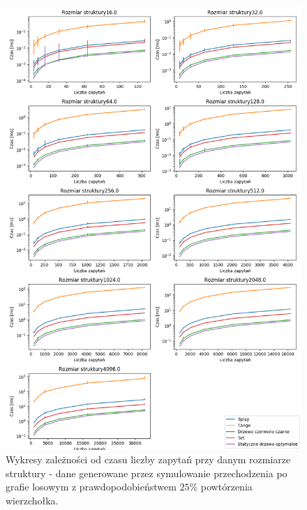 \documentclass[declaration,shortabstract]{iithesis}
\theoremstyle{thm}
\theoremstyle{remark}
\theoremstyle{plain}
\theoremstyle{plain}
\theoremstyle{plain}
\begin{document}
\begin{figure}[H]  
\centering
    \includegraphics[scale=0.5]{wykresy/randwalk75.png}
      \caption{Wykresy zależności od czasu liczby zapytań przy danym rozmiarze struktury - dane generowane przez symulowanie przechodzenia po grafie losowym z prawdopodobieństwem  \(25\%\) powtórzenia wierzchołka. }  
    \label{fig:zigzig} 
\end{figure}
\end{document}

